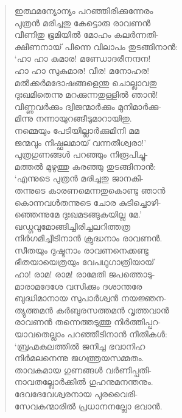 \begin{verse}
ഇത്ഥമന്യോന്യം പറഞ്ഞിരിക്കുന്നേരം\\
പുത്രന്‍ മരിച്ചതു കേട്ടൊരു രാവണന്‍\\
വീണിതു ഭൂമിയില്‍ മോഹം കലര്‍ന്നതി-\\
ക്ഷീണനായ് പിന്നെ വിലാപം തുടങ്ങിനാന്‍:\\
‘ഹാ ഹാ കുമാര! മണ്ഡോദരീനന്ദന!\\
ഹാ ഹാ സുകുമാര! വീര! മനോഹര!\\
മല്‍ക്കര്‍മദോഷങ്ങളെന്തു ചൊല്ലാവതു\\
ദുഃഖമിതെന്നു മറക്കുന്നതുള്ളില്‍ ഞാന്‍!\\
വിണ്ണവര്‍ക്കും ദ്വിജന്മാര്‍ക്കും മുനിമാര്‍ക്കു-\\
മിന്നു നന്നായുറങ്ങീടുമാറായിതു.\\
നമ്മെയും പേടിയില്ലാര്‍ക്കുമിനി മമ\\
ജന്മവും നിഷ്ഫലമായ് വന്നതീശ്വരാ!’\\
പുത്രഗുണങ്ങള്‍ പറഞ്ഞും നിരൂപിച്ചു-\\
മത്തല്‍ മുഴുത്തു കരഞ്ഞു തുടങ്ങിനാന്‍:\\
‘എന്നുടെ പുത്രന്‍ മരിച്ചതു ജാനകി-\\
തന്നുടെ കാരണമെന്നതുകൊണ്ടു ഞാന്‍\\
കൊന്നവള്‍തന്നുടെ ചോര കുടിച്ചൊഴി-\\
ഞ്ഞെന്നുമേ ദുഃഖമടങ്ങുകയില്ല മേ.’\\
ഖഡ്ഗവുമോങ്ങിച്ചിരിച്ചലറിത്തത്ര\\
നിര്‍ഗമിച്ചീടിനാന്‍ ക്രുദ്ധനാം രാവണന്‍.\\
സീതയും ദുഷ്ടനാം രാവണനെക്കണ്ടു\\
ഭീതയായെത്രയും വേപഥുഗാത്രിയായ്\\
ഹാ! രാമ! രാമ! രാമേതി ജപത്തൊടു-\\
മാരാമദേശേ വസിക്കും ദശാന്തരേ\\
ബുദ്ധിമാനായ സുപാര്‍ശ്വന്‍ നയജ്ഞന-\\
ത്യുത്തമന്‍ കര്‍ബുരസത്തമന്‍ വൃത്തവാന്‍\\
രാവണന്‍ തന്നെത്തടുത്തു നിര്‍ത്തിപ്പറ-\\
യാവതെല്ലാം പറഞ്ഞീടിനാന്‍ നീതികള്‍:\\
‘ബ്രഹ്മകുലത്തില്‍ ജനിച്ച ഭവാനിഹ\\
നിര്‍മലനെന്നു ജഗത്ത്രയസമ്മതം.\\
താവകമായ ഗുണങ്ങള്‍ വര്‍ണിപ്പതി-\\
നാവതല്ലോര്‍ക്കില്‍ ഗുഹനുമനന്തനും.\\
ദേവദേവേശ്വരനായ പുരവൈരി-\\
സേവകന്മാരില്‍ പ്രധാനനല്ലോ ഭവാന്‍.\\

\end{verse}
